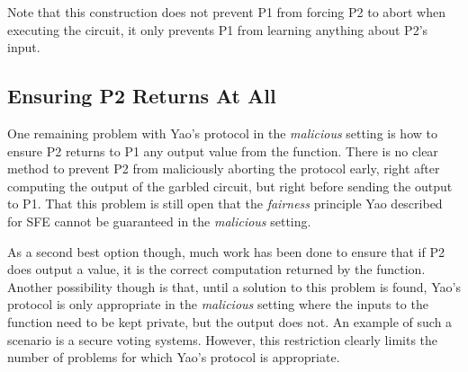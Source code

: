 Note that this construction does not prevent \ac{P1} from forcing \ac{P2} to abort when executing the circuit, it only prevents \ac{P1} from learning anything about \ac{P2}'s input.


\subsection{Ensuring \ac{P2} Returns At All}

One remaining problem with Yao's protocol in the \emph{malicious} setting is how to ensure \ac{P2} returns to \ac{P1} any output value from the function.  There is no clear method to prevent \ac{P2} from maliciously aborting the protocol early, right after computing the output of the garbled circuit, but right before sending the output to \ac{P1}.  That this problem is still open that the \emph{fairness} principle Yao described for \ac{SFE} cannot be guaranteed in the \emph{malicious} setting.

As a second best option though, much work has been done to ensure that if \ac{P2} does output a value, it is the correct computation returned by the function\cite{shen2011two}.  Another possibility though is that, until a solution to this problem is found, Yao's protocol is only appropriate in the \emph{malicious} setting where the inputs to the function need to be kept private, but the output does not.  An example of such a scenario is a secure voting systems.  However, this restriction clearly limits the number of problems for which Yao's protocol is appropriate.

